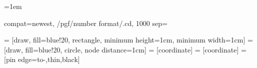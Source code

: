 \renewcommand{\sfdefault}{lmss}     %
\newcommand{\R}{\mathbb{R}}         %
\newcommand{\N}{\mathbb{N}}         %
\newcommand{\C}{\mathbb{C}}         %
\newcommand{\de}{\mathrm{d}}      %
\newcommand{\entspricht}{\mathrel{\widehat{=}}}


\setlength{\parindent}{0px}         %
\setlength{\parindent}{0px}         %
\emergencystretch=1em %
\setlength{\topmargin}{-5mm} %
\newlength{\mylength}
\setlength{\mylength}{\paperwidth}
\addtolength{\mylength}{-2in} %
\setlength{\textwidth}{145mm}
\setlength{\textheight}{230mm}
\addtolength{\mylength}{-\textwidth}
\setlength{\oddsidemargin}{10mm}
\addtolength{\mylength}{-\oddsidemargin}
\setlength{\evensidemargin}{\mylength}
\setlength{\marginparwidth}{1.7cm}

\makeatletter
\renewcommand*{\@textcolor}[3]{%
	\protect\leavevmode
	\begingroup
	\color#1{#2}#3%
	\endgroup
}
\makeatother

\pgfplotsset
{compat=newest, %
	/pgf/number format/.cd, %
	1000 sep={} %
}
\usetikzlibrary{arrows.meta}
\usetikzlibrary{calc}
\usetikzlibrary{datavisualization.formats.functions}
\usetikzlibrary{intersections}
\usetikzlibrary{patterns}
\usetikzlibrary{pgfplots.colormaps}
\usetikzlibrary{plotmarks}
\usetikzlibrary{shapes.geometric}

 = [draw, fill=blue!20, rectangle, minimum height=1cm, minimum width=1cm]%
 = [draw, fill=blue!20, circle, node distance=1cm]
 = [coordinate]
 = [coordinate]
 = [pin edge={to-,thin,black}]
